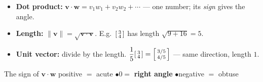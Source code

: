 \documentclass[aspectratio=169, 11pt]{beamer}
\newcommand{\vv}{\mathbf{v}}
\newcommand{\ww}{\mathbf{w}}
\begin{document}
\begin{frame}[t, plain]
  \begin{itemize}
    \setlength{\itemsep}{6pt}
    \item \textbf{Dot product:} $\vv\cdot\ww=v_1w_1+v_2w_2+\cdots$ --- one number; its \emph{sign} gives the angle.
    \item \textbf{Length:} $\|\vv\|=\sqrt{\vv\cdot\vv}$. \quad E.g.\ $\begin{bsmallmatrix} 3\\4 \end{bsmallmatrix}$ has length $\sqrt{9+16}=5$.
    \item \textbf{Unit vector:} divide by the length. \quad $\dfrac{1}{5}\begin{bsmallmatrix} 3\\4 \end{bsmallmatrix}=\begin{bsmallmatrix} 3/5\\4/5 \end{bsmallmatrix}$ --- same direction, length $1$.
  \end{itemize}
  \vspace{4pt}
  \begin{block}{The sign of $\vv\cdot\ww$}
    positive $=$ acute \quad$\bullet$\quad $0=$ \textbf{right angle} \quad$\bullet$\quad negative $=$ obtuse
  \end{block}
\end{frame}
\end{document}
